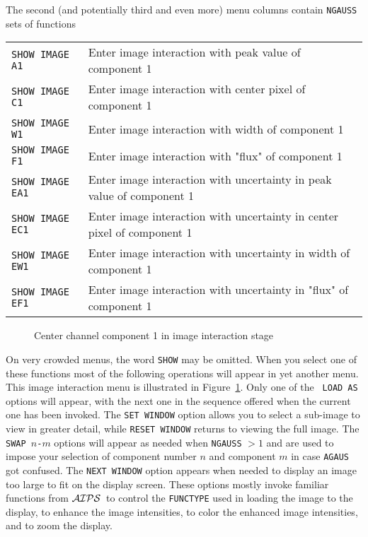 \documentclass[twoside]{article}
\newcommand{\AIPS}{{$\cal AIPS\/$}}
\newcommand{\putfig}[1]{\texttt{[image: \#1.eps]}}
\begin{document}
The second (and potentially third and even more) menu columns
contain {\tt NGAUSS} sets of functions

\begin{center}
\begin{tabular}{|l|l|}\hline
 {\tt SHOW IMAGE A1 } & Enter image interaction with peak value of
                     component 1\\
 {\tt SHOW IMAGE C1 } & Enter image interaction with center pixel of
                     component 1\\
 {\tt SHOW IMAGE W1 } & Enter image interaction with width of
                     component 1\\
 {\tt SHOW IMAGE F1 } & Enter image interaction with "flux" of
                     component 1\\
 {\tt SHOW IMAGE EA1} & Enter image interaction with uncertainty in
                     peak value of component 1\\
 {\tt SHOW IMAGE EC1} & Enter image interaction with uncertainty in
                     center pixel of component 1\\
 {\tt SHOW IMAGE EW1} & Enter image interaction with uncertainty in
                     width of component 1\\
 {\tt SHOW IMAGE EF1} & Enter image interaction with uncertainty in
                     "flux" of component 1\\ \hline
\end{tabular}
\end{center}

\begin{figure}
\begin{center}
\resizebox{6.0in}{!}{\putfig{AGAUS.image1c}}
\caption{Center channel component 1 in image interaction stage}
\label{fig:AGAUS.image}
\end{center}
\end{figure}

On very crowded menus, the word {\tt SHOW} may be omitted.  When you
select one of these functions most of the following operations will
appear in yet another menu.  This image interaction menu is
illustrated in Figure~\ref{fig:AGAUS.image}.  Only one of the {\tt
  LOAD AS} options will appear, with the next one in the sequence
offered when the current one has been invoked.  The {\tt SET WINDOW}
option allows you to select a sub-image to view in greater detail,
while {\tt RESET WINDOW} returns to viewing the full image.  The {\tt
  SWAP $n$-$m$} options will appear as needed when {\tt NGAUSS} $ > 1$
and are used to impose your selection of component number $n$ and
component $m$ in case {\tt AGAUS} got confused.  The {\tt NEXT WINDOW}
option appears when needed to display an image too large to fit on the
display screen.  These options mostly invoke familiar functions from
\AIPS\ to control the {\tt FUNCTYPE} used in loading the image to the
display, to enhance the image intensities, to color the enhanced image
intensities, and to zoom the display.
\end{document}
